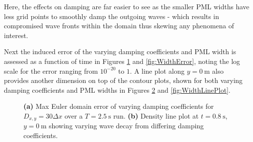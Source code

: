 Here, the effects on damping are far easier to see as the smaller PML widths have less grid points to smoothly damp the outgoing waves - which results in compromised wave fronts within the domain thus skewing any phenomena of interest.


Next the induced error of the varying damping coefficients and PML width is assessed as a function of time in Figures \ref{fig:DampingError} and \ref{fig:WidthError}, noting the log scale for the error ranging from $10^{-20}$ to $1$. A line plot along $y=0 \ \mathrm{m}$ also provides another dimension on top of the contour plots, shown for both varying damping coefficients and PML widths in Figures \ref{fig:DampingLinePlot} and \ref{fig:WidthLinePlot}.


\begin{figure}[h]
    \centering
    \begin{subfigure}[h]{0.47\textwidth}
        \centering
        \caption{}
        \label{fig:DampingError}
    \end{subfigure}
    \hfill
    \begin{subfigure}[h]{0.47\textwidth}
        \centering
        \caption{}
        \label{fig:DampingLinePlot}
    \end{subfigure}
    \caption{\textbf{(a)} Max Euler domain error of varying damping coefficients for $D_{x,y}=30 \Delta x$ over a $T=2.5 \ \mathrm{s}$ run. \textbf{(b)} Density line plot at $t=0.8 \ \mathrm{s}$, $y=0 \ \mathrm{m}$ showing varying wave decay from differing damping coefficients.}
    \label{fig:DampingAccessories}
\end{figure}


